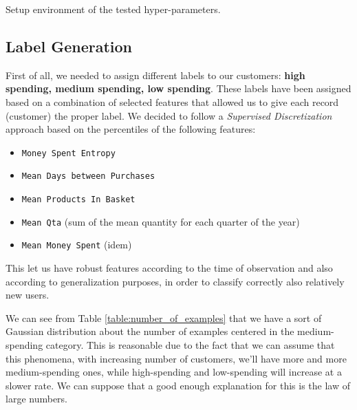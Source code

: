 \documentclass[12pt]{article}
\begin{document}
\begin{table}[h]
	\caption{Setup environment of the tested hyper-parameters.}
	\label{tab:hyper}
\end{table}

\subsection{Label Generation}
First of all, we needed to assign different labels to our customers: \textbf{high spending, medium spending, low spending}.
These labels have been assigned based on a combination of selected features that allowed us to give each record (customer) the proper label. We decided to follow a \textit{Supervised Discretization} approach based on the percentiles of the following features: 
\begin{itemize}
    \item \texttt{Money Spent Entropy}
    \item \texttt{Mean Days between Purchases}
    \item \texttt{Mean Products In Basket}
    \item \texttt{Mean Qta} (sum of the mean quantity for each quarter of the year)
    \item \texttt{Mean Money Spent} (idem)
\end{itemize}
This let us have robust features according to the time of observation and also according to generalization purposes, in order to classify correctly also relatively new users. \begin{table}[]

    \centering
    \caption{Distribution of examples for each label.}
    \label{table:number_of_examples}

\end{table}
We can see from Table \ref{table:number_of_examples} that we have a sort of Gaussian distribution about the number of examples centered in the medium-spending category. This is reasonable due to the fact that we can assume that this phenomena, with increasing number of customers, we'll have more and more medium-spending ones, while high-spending and low-spending will increase at a slower rate. We can suppose that a good enough explanation for this is the law of large numbers.
\end{document}
